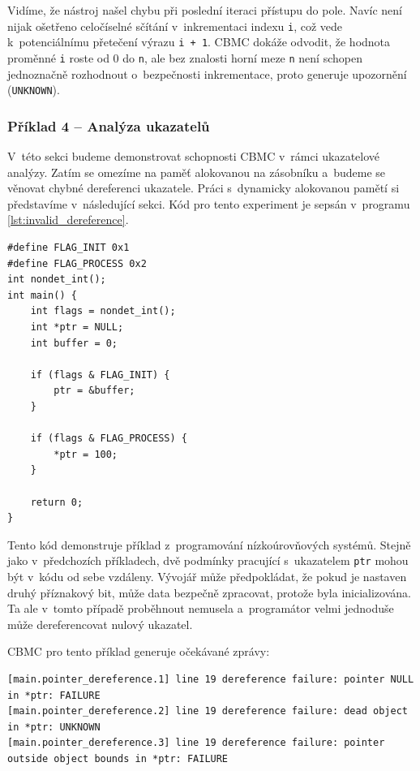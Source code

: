 \documentclass[a4paper, 11pt]{article}
\begin{document}
\noindent Vidíme, že nástroj našel chybu při poslední iteraci přístupu do pole.
Navíc není nijak ošetřeno celočíselné sčítání v~inkrementaci indexu \texttt{i}, což vede k~potenciálnímu přetečení výrazu \texttt{i + 1}.
CBMC dokáže odvodit, že hodnota proměnné \texttt{i} roste od 0 do \texttt{n}, ale bez znalosti horní meze \texttt{n} není schopen jednoznačně rozhodnout o~bezpečnosti inkrementace, proto generuje upozornění (\texttt{UNKNOWN}).

\subsubsection{Příklad 4 -- Analýza ukazatelů}

V~této sekci budeme demonstrovat schopnosti CBMC v~rámci ukazatelové analýzy.
Zatím se omezíme na paměť alokovanou na zásobníku a~budeme se věnovat chybné dereferenci ukazatele.
Práci s~dynamicky alokovanou pamětí si představíme v~následující sekci.
Kód pro tento experiment je sepsán v~programu \ref{lst:invalid_dereference}.

\begin{listing}[ht]
    \caption{Jednoduchý příklad demonstrující nevalidní dereferenci ukazatele.}
    \label{lst:invalid_dereference}
    \begin{verbatim}
#define FLAG_INIT 0x1
#define FLAG_PROCESS 0x2
int nondet_int();
int main() {
    int flags = nondet_int();
    int *ptr = NULL;
    int buffer = 0;

    if (flags & FLAG_INIT) {
        ptr = &buffer;
    }

    if (flags & FLAG_PROCESS) {
        *ptr = 100;
    }

    return 0;
}
    \end{verbatim}
\end{listing}

\noindent Tento kód demonstruje příklad z~programování nízkoúrovňových systémů.
Stejně jako v~předchozích příkladech, dvě podmínky pracující s~ukazatelem \texttt{ptr} mohou být v~kódu od sebe vzdáleny.
Vývojář může předpokládat, že pokud je nastaven druhý příznakový bit, může data bezpečně zpracovat, protože byla inicializována.
Ta ale v~tomto případě proběhnout nemusela a~programátor velmi jednoduše může dereferencovat nulový ukazatel.

CBMC pro tento příklad generuje očekávané zprávy:

\begin{lstlisting}
[main.pointer_dereference.1] line 19 dereference failure: pointer NULL in *ptr: FAILURE
[main.pointer_dereference.2] line 19 dereference failure: dead object in *ptr: UNKNOWN
[main.pointer_dereference.3] line 19 dereference failure: pointer outside object bounds in *ptr: FAILURE
\end{lstlisting}
\end{document}
